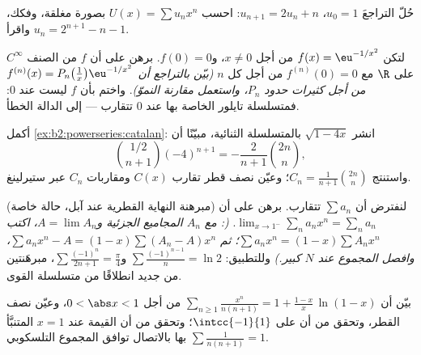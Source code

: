\begin{exercise}[$\star\star$]\label{exo:b2:powerseries:6}
حُلّ  التراجعَ $u_0 = 1$، $u_{n+1} =
2u_n + n$: احسب $U(x) = \sum u_nx^n$ بصورة مغلقة، وفكك،
واقرأ $u_n = 2^{n+1} - n - 1$.
\end{exercise}

\begin{exercise}[$\star\star$]\label{exo:b2:powerseries:7}
لتكن $f(x) = \eu^{-1/x^2}$ من أجل $x \neq 0$، و$f(0) = 0$. برهن على أن
$f$ من الصنف $C^\infty$ على $\R$ مع $f^{(n)}(0) = 0$ من أجل كل $n$
\emph{(بيّن بالتراجع أن $f^{(n)}(x) = P_n\bigl(\frac1x\bigr)
\eu^{-1/x^2}$ من أجل كثيرات حدود $P_n$، واستعمل مقارنة
النموّ)}. واختم بأن $f$ ليست  عند $0$: فمتسلسلة تايلور
الخاصة بها عند $0$ تتقارب --- إلى الدالة الخطأ.
\end{exercise}

\begin{exercise}[$\star\star\star$]\label{exo:b2:powerseries:8}
أكمل \cref{ex:b2:powerseries:catalan}: انشر $\sqrt{1 - 4x}$
بالمتسلسلة الثنائية، مبيّنًا أن
\[
\binom{1/2}{n+1}(-4)^{n+1} = -\frac{2}{n+1}\binom{2n}{n},
\]
واستنتج $C_n = \frac{1}{n+1}\binom{2n}{n}$؛ وعيّن نصف قطر
تقارب $C(x)$ ومقاربات $C_n$ عبر
ستيرلينغ.
\end{exercise}

\begin{exercise}[$\star\star\star$]\label{exo:b2:powerseries:9}
(مبرهنة النهاية القطرية عند آبل، حالة خاصة) لنفترض أن $\sum a_n$
تتقارب. برهن على أن $\lim_{x \to 1^-} \sum_{n} a_n x^n = \sum_n
a_n$. \emph{(: مع $A_n$ المجاميع الجزئية و$A =
\lim A_n$، اكتب $\sum a_nx^n = (1 - x)\sum A_n x^n$؛ ثم $\sum
a_nx^n - A = (1-x)\sum (A_n - A)x^n$، وافصل المجموع عند
$N$ كبير.)} وللتطبيق: $\sum \frac{(-1)^{n-1}}{n} = \ln 2$ و$\sum
\frac{(-1)^n}{2n+1} = \frac\pi4$، مبرهَنتين من جديد انطلاقًا من متسلسلة القوى.
\end{exercise}

\begin{exercise}[$\star$]\label{exo:b2:powerseries:10}
بيّن أن $\displaystyle\sum_{n\geq1}\frac{x^n}{n(n+1)} = 1 +
\frac{1-x}{x}\,\ln(1-x)$ من أجل $0 < \abs x < 1$، وعيّن
نصف القطر، وتحقق من أن  على
$\intcc{-1}{1}$؛ وتحقق من أن القيمة عند $x = 1$ المتنبَّأ بها
بالاتصال توافق المجموع التلسكوبي $\sum
\frac{1}{n(n+1)} = 1$.
\end{exercise}

